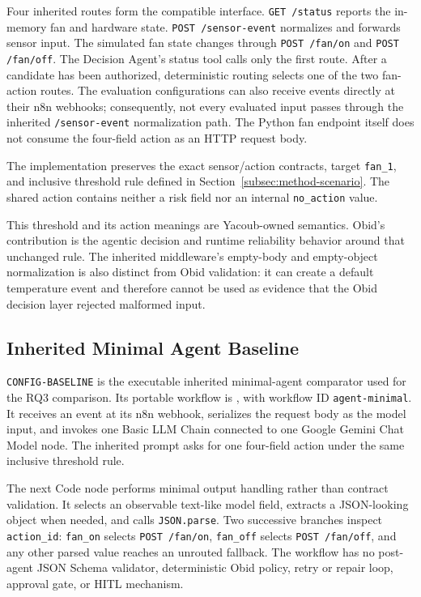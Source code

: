 Four inherited routes form the compatible interface. \texttt{GET /status}
reports the in-memory fan and hardware state.
\texttt{POST /sensor-event} normalizes and forwards sensor input. The simulated
fan state changes through \texttt{POST /fan/on} and \texttt{POST /fan/off}.
The Decision Agent's status tool calls only the first route. After a
candidate has been authorized, deterministic routing selects one of the two
fan-action routes. The evaluation configurations can also receive events
directly at their n8n webhooks; consequently, not every evaluated input passes
through the inherited \texttt{/sensor-event} normalization path. The Python fan
endpoint itself does not consume the four-field action as an HTTP request body.

The implementation preserves the exact sensor/action contracts, target
\texttt{fan\_1}, and inclusive threshold rule defined in
Section~\ref{subsec:method-scenario}. The shared action contains neither a risk
field nor an internal \texttt{no\_action} value.

This threshold and its action meanings are Yacoub-owned semantics. Obid's
contribution is the agentic decision and runtime reliability behavior around
that unchanged rule. The inherited middleware's empty-body and empty-object
normalization is also distinct from Obid validation: it can create a default
temperature event and therefore cannot be used as evidence that the Obid
decision layer rejected malformed input.

\subsection{Inherited Minimal Agent Baseline}\label{subsec:impl-baseline}

\texttt{CONFIG-BASELINE} is the executable inherited minimal-agent comparator
used for the RQ3 comparison. Its portable workflow is
,
with workflow ID \texttt{agent-minimal}. It receives an event at its n8n
webhook, serializes the request body as the model input, and invokes one Basic
LLM Chain connected to one Google Gemini Chat Model node. The inherited prompt
asks for one four-field action under the same inclusive threshold rule.

The next Code node performs minimal output handling rather than contract
validation. It selects an observable text-like model field, extracts a
JSON-looking object when needed, and calls \texttt{JSON.parse}. Two successive
branches inspect \texttt{action\_id}: \texttt{fan\_on} selects
\texttt{POST /fan/on}, \texttt{fan\_off} selects
\texttt{POST /fan/off}, and any other parsed value reaches an unrouted
fallback. The workflow has no post-agent JSON Schema validator, deterministic
Obid policy, retry or repair loop, approval gate, or HITL mechanism.

